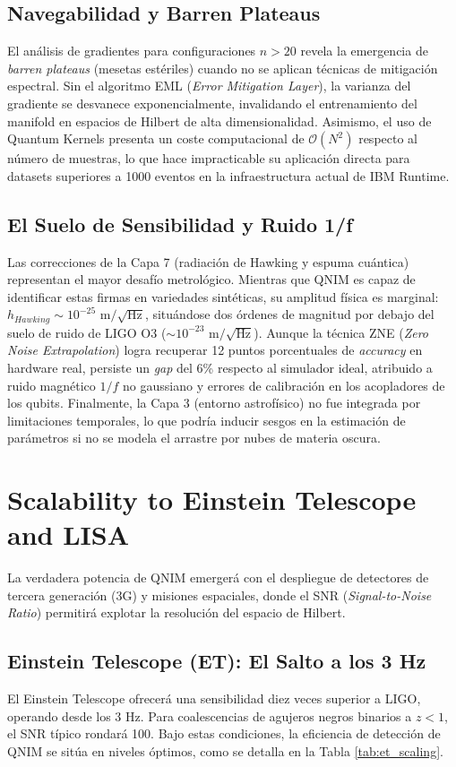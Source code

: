 \documentclass[11pt,a4paper,spanish]{book}
\numberwithin{equation}{chapter}
\numberwithin{figure}{chapter}
\numberwithin{equation}{chapter}
\numberwithin{figure}{chapter}
\numberwithin{table}{chapter}
\begin{document}
\subsection{Navegabilidad y Barren Plateaus}
El análisis de gradientes para configuraciones $n > 20$ revela la emergencia de \textit{barren plateaus} (mesetas estériles) cuando no se aplican técnicas de mitigación espectral. Sin el algoritmo EML (\textit{Error Mitigation Layer}), la varianza del gradiente se desvanece exponencialmente, invalidando el entrenamiento del manifold en espacios de Hilbert de alta dimensionalidad. Asimismo, el uso de Quantum Kernels presenta un coste computacional de $\mathcal{O}(N^2)$ respecto al número de muestras, lo que hace impracticable su aplicación directa para datasets superiores a 1000 eventos en la infraestructura actual de IBM Runtime.

\subsection{El Suelo de Sensibilidad y Ruido 1/f}
Las correcciones de la Capa 7 (radiación de Hawking y espuma cuántica) representan el mayor desafío metrológico. Mientras que QNIM es capaz de identificar estas firmas en variedades sintéticas, su amplitud física es marginal: $h_{Hawking} \sim 10^{-25} \text{ m}/\sqrt{\text{Hz}}$, situándose dos órdenes de magnitud por debajo del suelo de ruido de LIGO O3 ($\sim 10^{-23} \text{ m}/\sqrt{\text{Hz}}$). Aunque la técnica ZNE (\textit{Zero Noise Extrapolation}) logra recuperar 12 puntos porcentuales de \textit{accuracy} en hardware real, persiste un \textit{gap} del 6\% respecto al simulador ideal, atribuido a ruido magnético $1/f$ no gaussiano y errores de calibración en los acopladores de los qubits. Finalmente, la Capa 3 (entorno astrofísico) no fue integrada por limitaciones temporales, lo que podría inducir sesgos en la estimación de parámetros si no se modela el arrastre por nubes de materia oscura.

\section{Scalability to Einstein Telescope and LISA}

La verdadera potencia de QNIM emergerá con el despliegue de detectores de tercera generación (3G) y misiones espaciales, donde el SNR (\textit{Signal-to-Noise Ratio}) permitirá explotar la resolución del espacio de Hilbert.

\subsection{Einstein Telescope (ET): El Salto a los 3 Hz}
El Einstein Telescope \cite{Punturo_2010} ofrecerá una sensibilidad diez veces superior a LIGO, operando desde los 3 Hz. Para coalescencias de agujeros negros binarios a $z < 1$, el SNR típico rondará 100. Bajo estas condiciones, la eficiencia de detección de QNIM se sitúa en niveles óptimos, como se detalla en la Tabla \ref{tab:et_scaling}.
\end{document}
